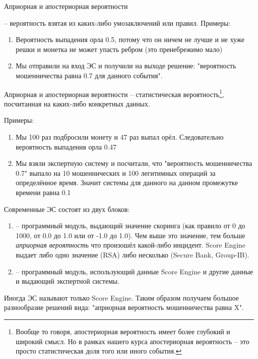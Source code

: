   \begin{frame}{Априорная и апостериорная вероятности}
  
   -- вероятность взятая из каких-либо умозаключений или правил.
  Примеры:
  \begin{enumerate}
  	\item Вероятность выпадения орла 0.5, потому что он ничем не лучше и не хуже решки и монетка не может упасть ребром (это пренебрежимо мало)
  	\item Мы отправили  на вход ЭС и получили на выходе решение: "вероятность мошенничества равна 0.7 для данного события".
  \end{enumerate}
   
  \end{frame}

  \begin{frame}{Априорная и апостериорная вероятности}
 -- статистическая вероятность\footnote{
	Вообще то говоря, апостериорная вероятность имеет более глубокий и широкий смысл.
	Но в рамках нашего курса апостериорная вероятность -- это просто статистическая доля того или иного события.}, посчитанная на каких-либо конкретных данных.

	Примеры: \small
	\begin{enumerate}
		\item Мы 100 раз подбросили монету и 47 раз выпал орёл. Следовательно 
		вероятность выпадения орла 0.47
		\item Мы взяли экспертную систему и посчитали, что "вероятность мошенничества 0.7"
		выпало на 10 мошеннических и 100 легитимных операций за определённое время. 
		Значит  системы для данного  на данном промежутке времени равна 0.1
	\end{enumerate}
\end{frame}
  
  \begin{frame}
  Современные ЭС состоят из двух блоков:
  \begin{enumerate}
  	\item {} -- программный модуль, выдающий значение скоринга (как правило от 0 до 1000, от 0.0 до 1.0 или от -1.0 до 1.0). Чем выше это значение, тем больше
  	\textit{априорная вероятность} что произошёл какой-либо инцидент.
  	Score Engine выдает либо одно значение (RSA) 
  	либо несколько (Secure Bank, Group-IB).
  	\item {} -- программный модуль, использующий данные Score Engine и другие данные 
  	и выдающий  экспертной системы.
  \end{enumerate}

  Иногда ЭС называют только Score Engine. Таким образом получаем большое разнообразие решений вида: "априорная вероятность мошенничества равна X".
  \end{frame}
  
